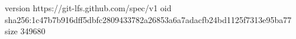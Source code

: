 version https://git-lfs.github.com/spec/v1
oid sha256:1c47b7b916dff5dbfc2809433782a26853a6a7adacfb24bd1125f7313e95ba77
size 349680
